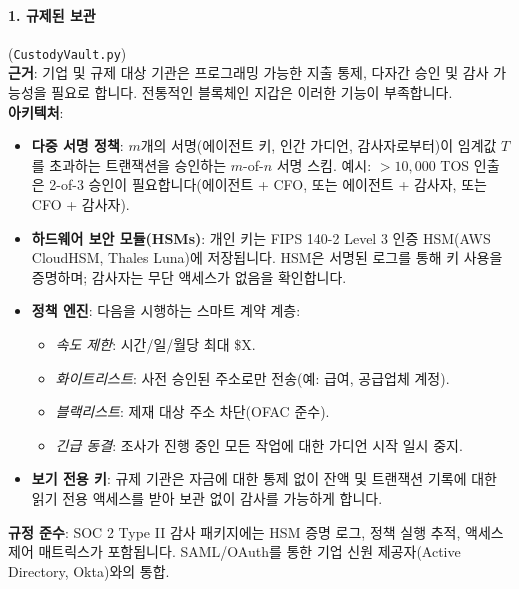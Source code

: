 \documentclass[11pt]{article}
\begin{document}
\paragraph{1. 규제된 보관} (\texttt{CustodyVault.py})\\
\textbf{근거}: 기업 및 규제 대상 기관은 프로그래밍 가능한 지출 통제, 다자간 승인 및 감사 가능성을 필요로 합니다. 전통적인 블록체인 지갑은 이러한 기능이 부족합니다.\\
\textbf{아키텍처}:
\begin{itemize}[noitemsep]
  \item \textbf{다중 서명 정책}: $m$개의 서명(에이전트 키, 인간 가디언, 감사자로부터)이 임계값 $T$를 초과하는 트랜잭션을 승인하는 $m$-of-$n$ 서명 스킴. 예시: $>10,000$ TOS 인출은 2-of-3 승인이 필요합니다(에이전트 + CFO, 또는 에이전트 + 감사자, 또는 CFO + 감사자).
  \item \textbf{하드웨어 보안 모듈(HSMs)}: 개인 키는 FIPS 140-2 Level 3 인증 HSM(AWS CloudHSM, Thales Luna)에 저장됩니다. HSM은 서명된 로그를 통해 키 사용을 증명하며; 감사자는 무단 액세스가 없음을 확인합니다.
  \item \textbf{정책 엔진}: 다음을 시행하는 스마트 계약 계층:
    \begin{itemize}[noitemsep]
      \item \emph{속도 제한}: 시간/일/월당 최대 \$X.
      \item \emph{화이트리스트}: 사전 승인된 주소로만 전송(예: 급여, 공급업체 계정).
      \item \emph{블랙리스트}: 제재 대상 주소 차단(OFAC 준수).
      \item \emph{긴급 동결}: 조사가 진행 중인 모든 작업에 대한 가디언 시작 일시 중지.
    \end{itemize}
  \item \textbf{보기 전용 키}: 규제 기관은 자금에 대한 통제 없이 잔액 및 트랜잭션 기록에 대한 읽기 전용 액세스를 받아 보관 없이 감사를 가능하게 합니다.
\end{itemize}
\textbf{규정 준수}: SOC 2 Type II 감사 패키지에는 HSM 증명 로그, 정책 실행 추적, 액세스 제어 매트릭스가 포함됩니다. SAML/OAuth를 통한 기업 신원 제공자(Active Directory, Okta)와의 통합.
\end{document}
